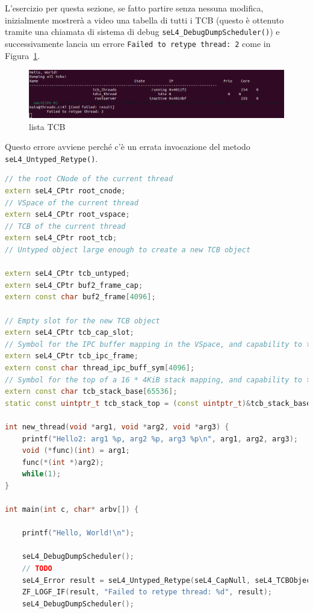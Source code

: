 L'esercizio per questa sezione, se fatto partire senza nessuna modifica, inizialmente mostrerà a video una tabella di tutti i TCB (questo è ottenuto tramite una chiamata di sistema di debug \texttt{seL4\_DebugDumpScheduler()}) e successivamente lancia un errore \texttt{Failed to retype thread: 2} come in Figura~\ref{fig:TutorialThreads}.\\
\begin{figure}[h]
  \includegraphics[width=\linewidth]{img/Threads.png}
  \caption{lista TCB}
  \label{fig:TutorialThreads}
\end{figure}

Questo errore avviene perché c'è un errata invocazione del metodo \texttt{seL4\_Untyped\_Retype()}.
\begin{lstlisting}[language=C++]
// the root CNode of the current thread
extern seL4_CPtr root_cnode;
// VSpace of the current thread
extern seL4_CPtr root_vspace;
// TCB of the current thread
extern seL4_CPtr root_tcb;
// Untyped object large enough to create a new TCB object

extern seL4_CPtr tcb_untyped;
extern seL4_CPtr buf2_frame_cap;
extern const char buf2_frame[4096];

// Empty slot for the new TCB object
extern seL4_CPtr tcb_cap_slot;
// Symbol for the IPC buffer mapping in the VSpace, and capability to the mapping
extern seL4_CPtr tcb_ipc_frame;
extern const char thread_ipc_buff_sym[4096];
// Symbol for the top of a 16 * 4KiB stack mapping, and capability to the mapping
extern const char tcb_stack_base[65536];
static const uintptr_t tcb_stack_top = (const uintptr_t)&tcb_stack_base + sizeof(tcb_stack_base);

int new_thread(void *arg1, void *arg2, void *arg3) {
    printf("Hello2: arg1 %p, arg2 %p, arg3 %p\n", arg1, arg2, arg3);
    void (*func)(int) = arg1;
    func(*(int *)arg2);
    while(1);
}

int main(int c, char* arbv[]) {

    printf("Hello, World!\n");

    seL4_DebugDumpScheduler();
	// TODO
    seL4_Error result = seL4_Untyped_Retype(seL4_CapNull, seL4_TCBObject, seL4_TCBBits, seL4_CapNull, 0, 0, seL4_CapNull, 1);
    ZF_LOGF_IF(result, "Failed to retype thread: %d", result);
    seL4_DebugDumpScheduler();
\end{lstlisting}

